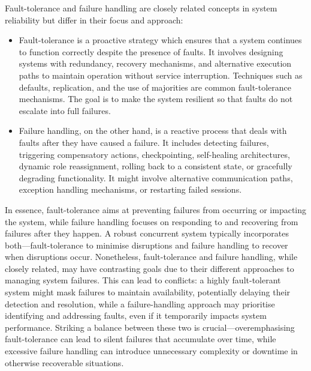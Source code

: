\documentclass{article}
\theoremstyle{definition}
\theoremstyle{definition}
\begin{document}
Fault-tolerance and failure handling are closely related concepts in system reliability but differ in their focus and approach:
\begin{itemize}
\item Fault-tolerance is a proactive strategy which ensures that a system continues to function correctly despite the presence of faults. It involves designing systems with redundancy, recovery mechanisms, and alternative execution paths to maintain operation without service interruption. Techniques such as defaults, replication, and the use of majorities are common fault-tolerance mechanisms. The goal is to make the system resilient so that faults do not escalate into full failures.
\item Failure handling, on the other hand, is a reactive process that deals with faults after they have caused a failure. It includes detecting failures, triggering compensatory actions, checkpointing, self-healing architectures, dynamic role reassignment, rolling back to a consistent state, or gracefully degrading functionality. It might involve alternative communication paths, exception handling mechanisms, or restarting failed sessions.
\end{itemize}
In essence, fault-tolerance aims at preventing failures from occurring or impacting the system, while failure handling focuses on responding to and recovering from failures after they happen. A robust concurrent system typically incorporates both—fault-tolerance to minimise disruptions and failure handling to recover when disruptions occur. Nonetheless, fault-tolerance and failure handling, while closely related, may have contrasting goals due to their different approaches to managing system failures. This can lead to conflicts: a highly fault-tolerant system might mask failures to maintain availability, potentially delaying their detection and resolution, while a failure-handling approach may prioritise identifying and addressing faults, even if it temporarily impacts system performance. Striking a balance between these two is crucial—overemphasising fault-tolerance can lead to silent failures that accumulate over time, while excessive failure handling can introduce unnecessary complexity or downtime in otherwise recoverable situations.
\end{document}
